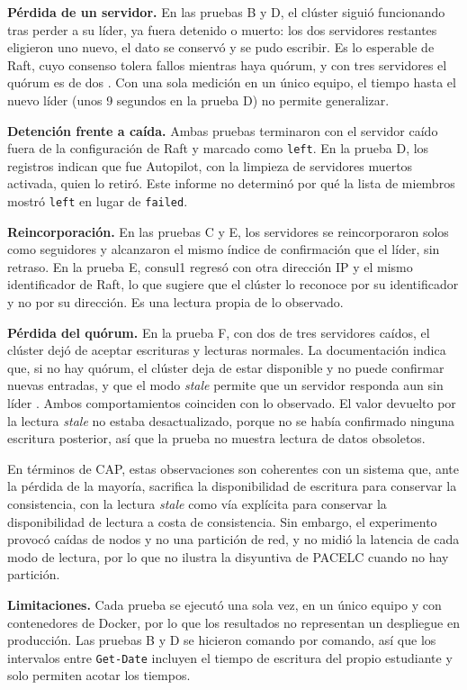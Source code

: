 \documentclass[12pt,a4paper]{article}
\begin{document}
\textbf{Pérdida de un servidor.} En las pruebas B y D, el clúster siguió funcionando tras perder
a su líder, ya fuera detenido o muerto: los dos servidores restantes eligieron uno nuevo, el
dato se conservó y se pudo escribir. Es lo esperable de Raft, cuyo consenso tolera fallos
mientras haya quórum, y con tres servidores el quórum es de dos \cite{consul_consensus}. Con
una sola medición en un único equipo, el tiempo hasta el nuevo líder (unos 9 segundos en la
prueba D) no permite generalizar.

\textbf{Detención frente a caída.} Ambas pruebas terminaron con el servidor caído fuera de la
configuración de Raft y marcado como \texttt{left}. En la prueba D, los registros indican que
fue Autopilot, con la limpieza de servidores muertos activada, quien lo retiró. Este informe no
determinó por qué la lista de miembros mostró \texttt{left} en lugar de \texttt{failed}.

\textbf{Reincorporación.} En las pruebas C y E, los servidores se reincorporaron solos como
seguidores y alcanzaron el mismo índice de confirmación que el líder, sin retraso. En la
prueba E, consul1 regresó con otra dirección IP y el mismo identificador de Raft, lo que
sugiere que el clúster lo reconoce por su identificador y no por su dirección. Es una lectura
propia de lo observado.

\textbf{Pérdida del quórum.} En la prueba F, con dos de tres servidores caídos, el clúster
dejó de aceptar escrituras y lecturas normales. La documentación indica que, si no hay quórum,
el clúster deja de estar disponible y no puede confirmar nuevas entradas, y que el modo
\textit{stale} permite que un servidor responda aun sin líder \cite{consul_consensus}. Ambos
comportamientos coinciden con lo observado. El valor devuelto por la lectura \textit{stale} no
estaba desactualizado, porque no se había confirmado ninguna escritura posterior, así que la
prueba no muestra lectura de datos obsoletos.

En términos de CAP, estas observaciones son coherentes con un sistema que, ante la pérdida de
la mayoría, sacrifica la disponibilidad de escritura para conservar la consistencia, con la
lectura \textit{stale} como vía explícita para conservar la disponibilidad de lectura a costa
de consistencia. Sin embargo, el experimento provocó caídas de nodos y no una partición de red,
y no midió la latencia de cada modo de lectura, por lo que no ilustra la disyuntiva de PACELC
cuando no hay partición.

\textbf{Limitaciones.} Cada prueba se ejecutó una sola vez, en un único equipo y con
contenedores de Docker, por lo que los resultados no representan un despliegue en producción.
Las pruebas B y D se hicieron comando por comando, así que los intervalos entre
\texttt{Get-Date} incluyen el tiempo de escritura del propio estudiante y solo permiten
acotar los tiempos.
\end{document}
